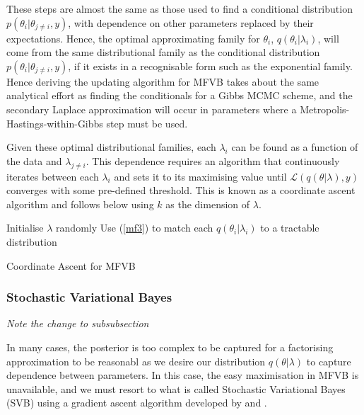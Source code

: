 \documentclass{article}\usepackage[]{graphicx}\usepackage[]{color}
\numberwithin{equation}{section}
\begin{document}
These steps are almost the same as those used to find a conditional distribution $p(\theta_i | \theta_{j \neq i}, y)$, with dependence on other parameters replaced by their expectations. Hence, the optimal approximating family for $\theta_i$, $q(\theta_i | \lambda_i)$, will come from the same distributional family as the conditional distribution $p(\theta_i | \theta_{j \neq i}, y)$, if it exists in a recognisable form such as the exponential family. Hence deriving the updating algorithm for MFVB takes about the same analytical effort as finding the conditionals for a Gibbs MCMC scheme, and the secondary Laplace approximation will occur in parameters where a Metropolis-Hastings-within-Gibbs step must be used.
\vspace{5mm}

Given these optimal distributional families, each $\lambda_i$ can be found as a function of the data and $\lambda_{j \neq i}$. This dependence requires an algorithm that continuously iterates between each $\lambda_i$ and sets it to its maximising value until $\mathcal{L}(q(\theta | \lambda), y)$ converges with some pre-defined threshold. This is known as a coordinate ascent algorithm and follows below using $k$ as the dimension of $\lambda$.

\vspace{2mm}

\begin{algorithm}[H]
 Initialise $\lambda$ randomly\;
 Use (\ref{mf3}) to match each $q(\theta_i|\lambda_i)$ to a tractable distribution\;
 \caption{Coordinate Ascent for MFVB}
  \label{alg:algorithm1}
\end{algorithm}

\subsubsection{Stochastic Variational Bayes}
\emph{Note the change to subsubsection}

In many cases, the posterior is too complex to be captured for a factorising approximation to be reasonabl as we desire our distribution $q(\theta | \lambda)$ to capture dependence between parameters. In this case, the easy maximisation in MFVB is unavailable, and we must resort to what is called Stochastic Variational Bayes (SVB) using a gradient ascent algorithm developed by \citet{Paisley2012} and \citet{Ranganash2014}.
\end{document}
